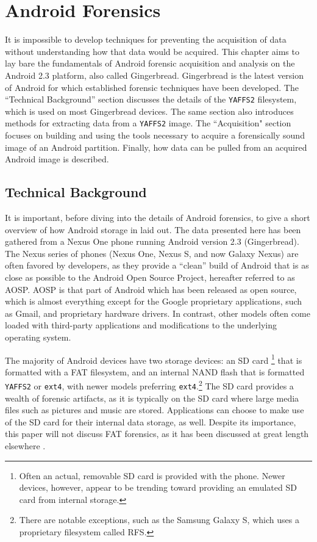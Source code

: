 \chapter{Android Forensics}
\label{ch:forensics}
It is impossible to develop techniques for preventing the acquisition of data without understanding how that data would be acquired.
This chapter aims to lay bare the fundamentals of Android forensic acquisition and analysis on the Android 2.3 platform, also called
Gingerbread. Gingerbread is the latest version of Android for which established forensic techniques have been developed.  The
``Technical Background'' section discusses the details of the \texttt{YAFFS2} filesystem, which is used on most Gingerbread devices.
The same section also introduces methods for extracting data from a \texttt{YAFFS2} image.  The ``Acquisition" section focuses on
building and using the tools necessary to acquire a forensically sound image of an Android partition.  Finally, how data can be
pulled from an acquired Android image is described.


\section{Technical Background}

It is important, before diving into the details of Android forensics, to give a short overview of how Android storage in laid out.  The
data presented here has been gathered from a Nexus One phone running Android version 2.3 (Gingerbread).  The Nexus series of phones
(Nexus One, Nexus S, and now Galaxy Nexus) are often favored by developers, as they provide a ``clean'' build of Android that is as
close as possible to the Android Open Source Project, hereafter referred to as AOSP. AOSP is that part of Android which has been
released as open source, which is almost everything except for the Google proprietary applications, such as Gmail, and proprietary
hardware drivers. In contrast, other models often come loaded with third-party applications and modifications to the underlying
operating system. 

The majority of Android devices have two storage devices: an SD card \footnote{Often an actual, removable SD card is provided with
the phone. Newer devices, however, appear to be trending toward providing an emulated SD card from internal storage.} that is
formatted with a FAT filesystem, and an internal NAND flash that is formatted \texttt{YAFFS2} or \texttt{ext4}, with newer models
preferring \texttt{ext4}.\footnote{There are notable exceptions, such as the Samsung Galaxy S, which uses a proprietary filesystem called RFS.} The SD
card provides a wealth of forensic artifacts, as it is typically on the SD card where large media files such as pictures and music
are stored.  Applications can choose to make use of the SD card for their internal data storage, as well.  Despite its importance,
this paper will not discuss FAT forensics, as it has been discussed at great length elsewhere \cite{carrier}. 

